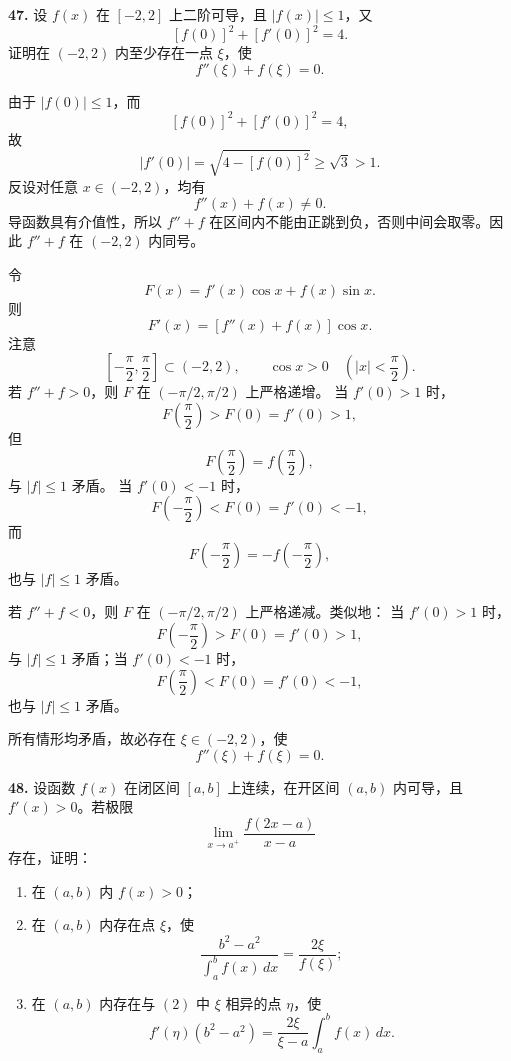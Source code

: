 \begin{problemblock}
\textbf{47.} 设 \(f(x)\) 在 \([-2,2]\) 上二阶可导，且 \(|f(x)|\le 1\)，又
\[
[f(0)]^2+[f'(0)]^2=4.
\]
证明在 \((-2,2)\) 内至少存在一点 \(\xi\)，使
\[
f''(\xi)+f(\xi)=0.
\]
\end{problemblock}

\begin{solutionblock}
由于 \(|f(0)|\le 1\)，而
\[
[f(0)]^2+[f'(0)]^2=4,
\]
故
\[
|f'(0)|=\sqrt{4-[f(0)]^2}\ge \sqrt3>1.
\]
反设对任意 \(x\in(-2,2)\)，均有
\[
f''(x)+f(x)\ne 0.
\]
导函数具有介值性，所以 \(f''+f\) 在区间内不能由正跳到负，否则中间会取零。因此 \(f''+f\) 在 \((-2,2)\) 内同号。

令
\[
F(x)=f'(x)\cos x+f(x)\sin x.
\]
则
\[
F'(x)=[f''(x)+f(x)]\cos x.
\]
注意
\[
\left[-\frac{\pi}{2},\frac{\pi}{2}\right]\subset(-2,2),\qquad \cos x>0\quad\left(|x|<\frac{\pi}{2}\right).
\]
若 \(f''+f>0\)，则 \(F\) 在 \((-\pi/2,\pi/2)\) 上严格递增。
当 \(f'(0)>1\) 时，
\[
F\left(\frac{\pi}{2}\right)>F(0)=f'(0)>1,
\]
但
\[
F\left(\frac{\pi}{2}\right)=f\left(\frac{\pi}{2}\right),
\]
与 \(|f|\le1\) 矛盾。
当 \(f'(0)<-1\) 时，
\[
F\left(-\frac{\pi}{2}\right)<F(0)=f'(0)<-1,
\]
而
\[
F\left(-\frac{\pi}{2}\right)=-f\left(-\frac{\pi}{2}\right),
\]
也与 \(|f|\le1\) 矛盾。

若 \(f''+f<0\)，则 \(F\) 在 \((-\pi/2,\pi/2)\) 上严格递减。类似地：
当 \(f'(0)>1\) 时，
\[
F\left(-\frac{\pi}{2}\right)>F(0)=f'(0)>1,
\]
与 \(|f|\le1\) 矛盾；当 \(f'(0)<-1\) 时，
\[
F\left(\frac{\pi}{2}\right)<F(0)=f'(0)<-1,
\]
也与 \(|f|\le1\) 矛盾。

所有情形均矛盾，故必存在 \(\xi\in(-2,2)\)，使
\[
f''(\xi)+f(\xi)=0.
\]
\end{solutionblock}

\begin{problemblock}
\textbf{48.} 设函数 \(f(x)\) 在闭区间 \([a,b]\) 上连续，在开区间 \((a,b)\) 内可导，且 \(f'(x)>0\)。若极限
\[
\lim_{x\to a^+}\frac{f(2x-a)}{x-a}
\]
存在，证明：
\begin{enumerate}
\item 在 \((a,b)\) 内 \(f(x)>0\)；
\item 在 \((a,b)\) 内存在点 \(\xi\)，使
\[
\frac{b^2-a^2}{\int_a^b f(x)\,dx}=\frac{2\xi}{f(\xi)};
\]
\item 在 \((a,b)\) 内存在与 \((2)\) 中 \(\xi\) 相异的点 \(\eta\)，使
\[
f'(\eta)(b^2-a^2)=\frac{2\xi}{\xi-a}\int_a^b f(x)\,dx.
\]
\end{enumerate}
\end{problemblock}

